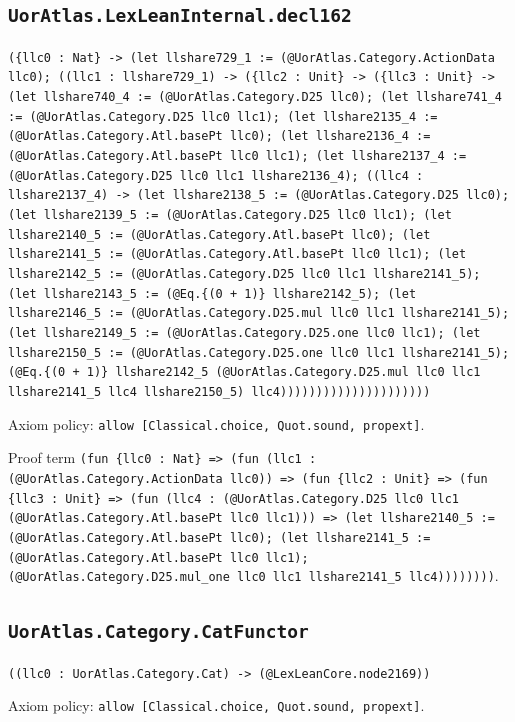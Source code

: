 \documentclass[11pt]{article}
\begin{document}
\subsection*{\texttt{UorAtlas.LexLeanInternal.decl162}}
\noindent\texttt{(\{llc0 : Nat\} -> (let llshare729\_1 := (@UorAtlas.Category.ActionData llc0); ((llc1 : llshare729\_1) -> (\{llc2 : Unit\} -> (\{llc3 : Unit\} -> (let llshare740\_4 := (@UorAtlas.Category.D25 llc0); (let llshare741\_4 := (@UorAtlas.Category.D25 llc0 llc1); (let llshare2135\_4 := (@UorAtlas.Category.Atl.basePt llc0); (let llshare2136\_4 := (@UorAtlas.Category.Atl.basePt llc0 llc1); (let llshare2137\_4 := (@UorAtlas.Category.D25 llc0 llc1 llshare2136\_4); ((llc4 : llshare2137\_4) -> (let llshare2138\_5 := (@UorAtlas.Category.D25 llc0); (let llshare2139\_5 := (@UorAtlas.Category.D25 llc0 llc1); (let llshare2140\_5 := (@UorAtlas.Category.Atl.basePt llc0); (let llshare2141\_5 := (@UorAtlas.Category.Atl.basePt llc0 llc1); (let llshare2142\_5 := (@UorAtlas.Category.D25 llc0 llc1 llshare2141\_5); (let llshare2143\_5 := (@Eq.\{(0 + 1)\} llshare2142\_5); (let llshare2146\_5 := (@UorAtlas.Category.D25.mul llc0 llc1 llshare2141\_5); (let llshare2149\_5 := (@UorAtlas.Category.D25.one llc0 llc1); (let llshare2150\_5 := (@UorAtlas.Category.D25.one llc0 llc1 llshare2141\_5); (@Eq.\{(0 + 1)\} llshare2142\_5 (@UorAtlas.Category.D25.mul llc0 llc1 llshare2141\_5 llc4 llshare2150\_5) llc4)))))))))))))))))))))}\par
\noindent Axiom policy: \texttt{allow [Classical.choice, Quot.sound, propext]}.\par
\noindent Proof term \texttt{(fun \{llc0 : Nat\} => (fun (llc1 : (@UorAtlas.Category.ActionData llc0)) => (fun \{llc2 : Unit\} => (fun \{llc3 : Unit\} => (fun (llc4 : (@UorAtlas.Category.D25 llc0 llc1 (@UorAtlas.Category.Atl.basePt llc0 llc1))) => (let llshare2140\_5 := (@UorAtlas.Category.Atl.basePt llc0); (let llshare2141\_5 := (@UorAtlas.Category.Atl.basePt llc0 llc1); (@UorAtlas.Category.D25.mul\_one llc0 llc1 llshare2141\_5 llc4))))))))}.\par
\subsection*{\texttt{UorAtlas.Category.CatFunctor}}
\noindent\texttt{((llc0 : UorAtlas.Category.Cat) -> (@LexLeanCore.node2169))}\par
\noindent Axiom policy: \texttt{allow [Classical.choice, Quot.sound, propext]}.\par
\end{document}
